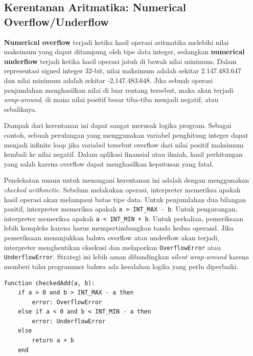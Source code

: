 \subsection{Kerentanan Aritmatika: Numerical Overflow/Underflow}

\textbf{Numerical overflow} terjadi ketika hasil operasi aritmatika melebihi nilai maksimum yang dapat ditampung oleh tipe data integer, sedangkan \textbf{numerical underflow} terjadi ketika hasil operasi jatuh di bawah nilai minimum. Dalam representasi signed integer 32-bit, nilai maksimum adalah sekitar 2.147.483.647 dan nilai minimum adalah sekitar -2.147.483.648. Jika sebuah operasi penjumlahan menghasilkan nilai di luar rentang tersebut, maka akan terjadi \textit{wrap-around}, di mana nilai positif besar tiba-tiba menjadi negatif, atau sebaliknya.

Dampak dari kerentanan ini dapat sangat merusak logika program. Sebagai contoh, sebuah perulangan yang menggunakan variabel penghitung integer dapat menjadi infinite loop jika variabel tersebut overflow dari nilai positif maksimum kembali ke nilai negatif. Dalam aplikasi finansial atau ilmiah, hasil perhitungan yang salah karena overflow dapat menghasilkan keputusan yang fatal.

Pendekatan umum untuk menangani kerentanan ini adalah dengan menggunakan \textit{checked arithmetic}. Sebelum melakukan operasi, interpreter memeriksa apakah hasil operasi akan melampaui batas tipe data. Untuk penjumlahan dua bilangan positif, interpreter memeriksa apakah \texttt{a > INT\_MAX - b}. Untuk pengurangan, interpreter memeriksa apakah \texttt{a < INT\_MIN + b}. Untuk perkalian, pemeriksaan lebih kompleks karena harus mempertimbangkan tanda kedua operand. Jika pemeriksaan menunjukkan bahwa overflow atau underflow akan terjadi, interpreter menghentikan eksekusi dan melaporkan \texttt{OverflowError} atau \texttt{UnderflowError}. Strategi ini lebih aman dibandingkan \textit{silent wrap-around} karena memberi tahu programmer bahwa ada kesalahan logika yang perlu diperbaiki.

\begin{tcolorbox}[title=Contoh Checked Addition,colback=gray!5,colframe=black!60,boxrule=0.5pt,arc=2mm]
\begin{verbatim}
function checkedAdd(a, b):
    if a > 0 and b > INT_MAX - a then
        error: OverflowError
    else if a < 0 and b < INT_MIN - a then
        error: UnderflowError
    else
        return a + b
    end
\end{verbatim}
\end{tcolorbox}
